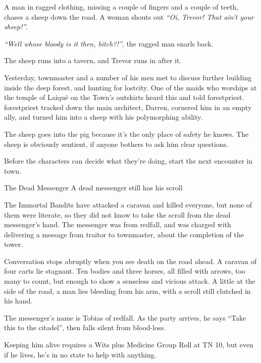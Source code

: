 \begin{multicols}{2}
\begin{boxtext}
	A man in ragged clothing, missing a couple of fingers and a couple of teeth, chases a sheep down the road.  A woman shouts out \emph{``Oi, Trevor! That ain't your sheep!''}.

	\emph{``Well whose bloody is it then, bitch?!''}, the ragged man snarls back.

	The sheep runs into a tavern, and Trevor runs in after it.

\end{boxtext}

Yesterday, \gls{townmaster} and a number of his men met to discuss further building inside the deep forest, and hunting for \gls{lostcity}.
One of the maids who worships at the temple of Laiqu\"{e} on the Town's outskirts heard this and told \gls{forestpriest}.
\Gls{forestpriest} tracked down the main architect, Darren, cornered him in an empty ally, and turned him into a sheep with his polymorphing ability.

The sheep goes into the \gls{pig} because it's the only place of safety he knows.  The sheep is obviously sentient, if anyone bothers to ask him clear questions.

Before the characters can decide what they're doing, start the next encounter in \gls{town}.

{The Dead Messenger}%
{A dead messenger still has his scroll}%

The Immortal Bandits have attacked a caravan and killed everyone, but none of them were literate, so they did not know to take the scroll from the dead messenger's hand.
The messenger was from \gls{redfall}, and was charged with delivering a message from \gls{traitor} to \gls{townmaster}, about the completion of the tower.

\begin{boxtext}

	Conversation stops abruptly when you see death on the road ahead.
	A caravan of four carts lie stagnant.
	Ten bodies and three horses, all filled with arrows, too many to count, but enough to show a senseless and vicious attack.
	A little at the side of the road, a man lies bleeding from his arm, with a scroll still clutched in his hand.

\end{boxtext}

The messenger's name is Tobias of \gls{redfall}.
As the party arrives, he says ``Take this to the citadel'', then falls silent from blood-loss.

Keeping him alive requires a Wits plus Medicine Group Roll at TN 10, but even if he lives, he's in no state to help with anything.


\end{multicols}
